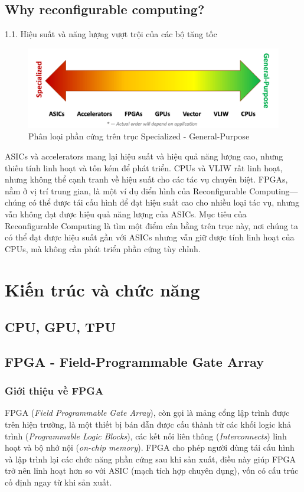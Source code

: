\documentclass[a4paper]{article}
\begin{document}
\subsection{Why reconfigurable computing?}
1.1. Hiệu suất và năng lượng vượt trội của các bộ tăng tốc
\begin{figure}[H]
    \centering
    \includegraphics[width=1\linewidth]{assets/phanloai.png}
    \caption{Phân loại phần cứng trên trục Specialized - General-Purpose}
    \label{fig:enter-label}
\end{figure}
ASICs và accelerators mang lại hiệu suất và hiệu quả năng lượng cao, nhưng thiếu tính linh hoạt và tốn kém để phát triển. CPUs và VLIW rất linh hoạt, nhưng không thể cạnh tranh về hiệu suất cho các tác vụ chuyên biệt. FPGAs, nằm ở vị trí trung gian, là một ví dụ điển hình của Reconfigurable Computing—chúng có thể được tái cấu hình để đạt hiệu suất cao cho nhiều loại tác vụ, nhưng vẫn không đạt được hiệu quả năng lượng của ASICs. Mục tiêu của Reconfigurable Computing là tìm một điểm cân bằng trên trục này, nơi chúng ta có thể đạt được hiệu suất gần với ASICs nhưng vẫn giữ được tính linh hoạt của CPUs, mà không cần phát triển phần cứng tùy chỉnh.
\section{Kiến trúc và chức năng}
\subsection{CPU, GPU, TPU}
\subsection{FPGA - Field-Programmable Gate Array}
\subsubsection{Giới thiệu về FPGA}

FPGA (\textit{Field Programmable Gate Array}), còn gọi là mảng cổng lập trình được trên hiện trường, là một thiết bị bán dẫn được cấu thành từ các khối logic khả trình (\textit{Programmable Logic Blocks}), các kết nối liên thông (\textit{Interconnects}) linh hoạt và bộ nhớ nội (\textit{on-chip memory}). FPGA cho phép người dùng tái cấu hình và lập trình lại các chức năng phần cứng sau khi sản xuất, điều này giúp FPGA trở nên linh hoạt hơn so với ASIC (mạch tích hợp chuyên dụng), vốn có cấu trúc cố định ngay từ khi sản xuất.
\end{document}

